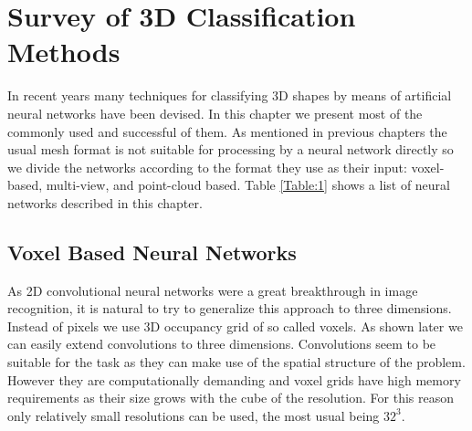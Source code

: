 \chapter{Survey of 3D Classification Methods}
\label{sec:chap3}
In recent years many techniques for classifying 3D shapes by means of artificial neural networks have been devised. In this chapter we present most of the commonly used and successful of them. As mentioned in previous chapters the usual mesh format is not suitable for processing by a neural network directly so we divide the networks according to the format they use as their input: voxel-based, multi-view, and point-cloud based. Table \ref{Table:1} shows a list of neural networks described in this chapter.



\section{Voxel Based Neural Networks}
As 2D convolutional neural networks were a great breakthrough in image recognition, it is natural to try to generalize this approach to three dimensions. Instead of pixels we use 3D occupancy grid of so called voxels. As shown later we can easily extend convolutions to three dimensions. Convolutions seem to be suitable for the task as they can make use of the spatial structure of the problem. However they are computationally demanding and voxel grids have high memory requirements as their size grows with the cube of the resolution. For this reason only relatively small resolutions can be used, the most usual being $32^3$. 

